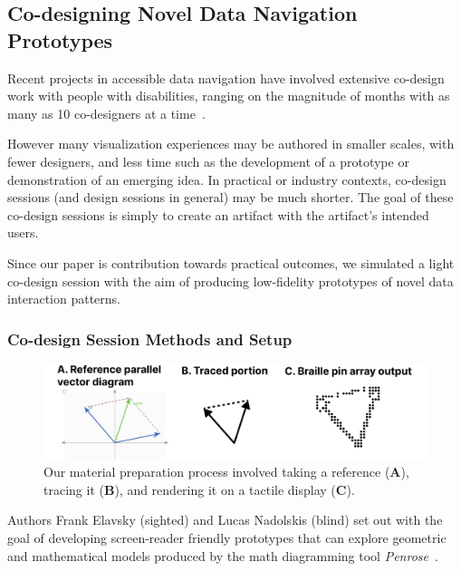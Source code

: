 \documentclass[journal]{vgtc}                %
\begin{document}
\subsection{Co-designing Novel Data Navigation Prototypes}
\label{section:codesign}

Recent projects in accessible data navigation have involved extensive co-design work with people with disabilities, ranging on the magnitude of months with as many as 10 co-designers at a time~\cite{Lundgard2019Sociotechnical,Lundgard2022Accessible,Zong2022Rich,Thompson2023Chart}.

However many visualization experiences may be authored in smaller scales, with fewer designers, and less time such as the development of a prototype or demonstration of an emerging idea. In practical or industry contexts, co-design sessions (and design sessions in general) may be much shorter. The goal of these co-design sessions is simply to create an artifact with the artifact's intended users.

Since our paper is contribution towards practical outcomes, we simulated a light co-design session with the aim of producing low-fidelity prototypes of novel data interaction patterns.

\subsubsection{Co-design Session Methods and Setup}
\begin{figure}[ht]
  \centering
  \includegraphics[width=\linewidth]{figures/braille.png}
  \caption{Our material preparation process involved taking a reference (\textbf{A}), tracing it (\textbf{B}), and rendering it on a tactile display (\textbf{C}).}
  \label{braille}
\end{figure}

Authors Frank Elavsky (sighted) and Lucas Nadolskis (blind) set out with the goal of developing screen-reader friendly prototypes that can explore geometric and mathematical models produced by the math diagramming tool \textit{Penrose}~\cite{Ye2020Penrose}.
\end{document}
